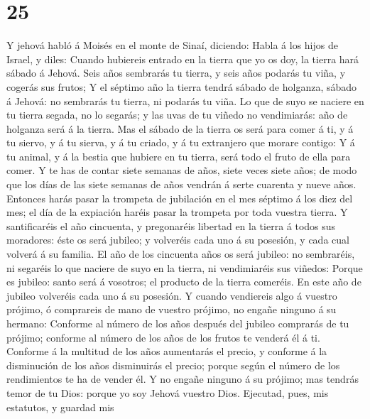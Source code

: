 \hypertarget{section-24}{%
\section{25}\label{section-24}}

 Y jehová habló á Moisés en el monte de Sinaí, diciendo:
 Habla á los hijos de Israel, y diles: Cuando hubiereis
entrado en la tierra que yo os doy, la tierra hará sábado á Jehová.
 Seis años sembrarás tu tierra, y seis años podarás tu viña,
y cogerás sus frutos;  Y el séptimo año la tierra tendrá
sábado de holganza, sábado á Jehová: no sembrarás tu tierra, ni podarás
tu viña.  Lo que de suyo se naciere en tu tierra segada, no
lo segarás; y las uvas de tu viñedo no vendimiarás: año de holganza será
á la tierra.  Mas el sábado de la tierra os será para comer
á ti, y á tu siervo, y á tu sierva, y á tu criado, y á tu extranjero que
morare contigo:  Y á tu animal, y á la bestia que hubiere en
tu tierra, será todo el fruto de ella para comer.  Y te has
de contar siete semanas de años, siete veces siete años; de modo que los
días de las siete semanas de años vendrán á serte cuarenta y nueve años.
 Entonces harás pasar la trompeta de jubilación en el mes
séptimo á los diez del mes; el día de la expiación haréis pasar la
trompeta por toda vuestra tierra.  Y santificaréis el año
cincuenta, y pregonaréis libertad en la tierra á todos sus moradores:
éste os será jubileo; y volveréis cada uno á su posesión, y cada cual
volverá á su familia.  El año de los cincuenta años os será
jubileo: no sembraréis, ni segaréis lo que naciere de suyo en la tierra,
ni vendimiaréis sus viñedos:  Porque es jubileo: santo será
á vosotros; el producto de la tierra comeréis.  En este año
de jubileo volveréis cada uno á su posesión.  Y cuando
vendiereis algo á vuestro prójimo, ó comprareis de mano de vuestro
prójimo, no engañe ninguno á su hermano:  Conforme al
número de los años después del jubileo comprarás de tu prójimo; conforme
al número de los años de los frutos te venderá él á ti. 
Conforme á la multitud de los años aumentarás el precio, y conforme á la
disminución de los años disminuirás el precio; porque según el número de
los rendimientos te ha de vender él.  Y no engañe ninguno á
su prójimo; mas tendrás temor de tu Dios: porque yo soy Jehová vuestro
Dios.  Ejecutad, pues, mis estatutos, y guardad mis
